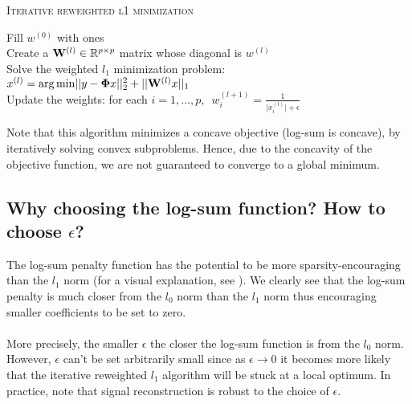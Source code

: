 \documentclass[a4paper,10pt]{article}
\theoremstyle{definition}
\begin{document}
{\fontsize{4}{4}\selectfont
\begin{algorithm}[h]  %
\caption{\textsc{Iterative reweighted l1 minimization}
}
%

    Fill $w^{(0)}$ with ones \\
    {
        Create a $\mathbf{W}^{(l)} \in \mathbb{R}^{p\times p}$ matrix whose diagonal is $w^{(l)}$ \\
        Solve the weighted $l_1$ minimization problem: $x^{(l)} = \operatorname*{arg\,min} \lvert\lvert y -  \mathbf{\Phi} x\rvert\rvert_2^2 + \lvert\lvert \mathbf{W}^{(l)}x\rvert\rvert_1$ \\
        Update the weights: for each $i = 1, ..., p, \enspace w_i^{(l+1)} = \frac{1}{\lvert x_i^{(l)} \rvert + \epsilon}$
    }

\end{algorithm}
}

\vskip 0.2in

Note that this algorithm minimizes a concave objective (log-sum is concave), by iteratively solving convex subproblems. Hence, due to the concavity of the objective function, we 
are not guaranteed to converge to a global minimum.

\subsection*{Why choosing the log-sum function? How to choose $\epsilon$?}

The log-sum penalty function has the potential to be more sparsity-encouraging than the $l_1$ norm (for a visual explanation, see \cite{Candes_Wakin_Boyd08}). We clearly see
that the log-sum penalty is much closer from the $l_0$ norm than the $l_1$ norm thus encouraging smaller coefficients to be set to zero. 
\\
\\
More precisely, the smaller $\epsilon$ the closer the log-sum function is from the $l_0$ norm. However, $\epsilon$ can't be set arbitrarily small since as $\epsilon \rightarrow 0$ it
becomes more likely that the iterative reweighted $l_1$ algorithm will be stuck at a local optimum. In practice, note that signal reconstruction is robust to the choice of $\epsilon$.
\end{document}
